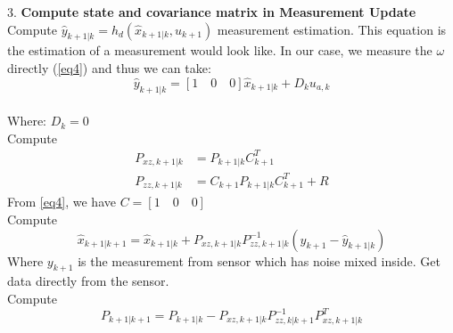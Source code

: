 \documentclass[12pt,a4paper]{article}
\begin{document}
	3. \textbf{Compute state and covariance matrix in Measurement Update}\\
	Compute \(\hat{y}_{k+1|k} = h_d(\hat{x}_{k+1|k},u_{k+1})\) measurement estimation. This equation is the estimation of a measurement would look like. In our case, we measure the $\omega$ directly (\autoref{eq4}) and thus we can take:
	\[\hat{y}_{k+1|k} = [1\quad 0\quad 0]\hat{x}_{k+1|k} + D_ku_{a,k}\]
	\\
	Where: \(D_k = 0\)
	\\
	Compute \[
	\begin{split}
		P_{xz,k+1|k} &= P_{k+1|k}C^T_{k+1}\\
		P_{zz,k+1|k} &= C_{k+1}P_{k+1|k}C^T_{k+1}+R
	\end{split}\]
	From \autoref{eq4}, we have \(C = [1\quad 0\quad 0]\)
	\\
	Compute
	\[\boxed{\hat{x}_{k+1|k+1} = \hat{x}_{k+1|k} + P_{xz,k+1|k}P^{-1}_{zz,k+1|k}(y_{k+1}-\hat{y}_{k+1|k})}\]
	Where \(y_{k+1}\) is the measurement from sensor which has noise mixed inside. Get data directly from the sensor.
	\\
	Compute
	\[\boxed{P_{k+1|k+1} = P_{k+1|k} - P_{xz,k+1|k}P^{-1}_{zz,k|k+1}P^T_{xz,k+1|k}}\]
	
	
	
	
\end{document}

